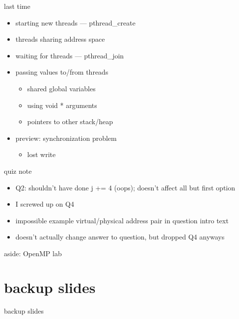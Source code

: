 \date{}
\title{}
\date{}

\begin{frame}
    \titlepage
\end{frame}



\begin{frame}{last time}
    \begin{itemize}
    \item starting new threads --- pthread\_create
    \item threads sharing address space
    \item waiting for threads --- pthread\_join
    \item passing values to/from threads
        \begin{itemize}
        \item shared global variables
        \item using void * arguments
        \item pointers to other stack/heap
        \end{itemize}
    \item preview: synchronization problem
        \begin{itemize}
        \item lost write
        \end{itemize}
    \end{itemize}
\end{frame}

\begin{frame}{quiz note}
    \begin{itemize}
    \item Q2: shouldn't have done j += 4 (oops); doesn't affect all but first option
    \vspace{.5cm}
    \item I screwed up on Q4
    \item impossible example virtual/physical address pair in question intro text
    \item doesn't actually change answer to question, but dropped Q4 anyways
    \end{itemize}
\end{frame}

\begin{frame}{aside: OpenMP lab}
\end{frame}





\section{backup slides}
\begin{frame}{backup slides}
\end{frame}




